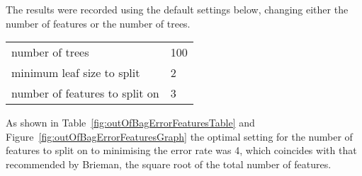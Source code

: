 		\begin{table}[H]
			\centering
			\begin{subtable}{.45\linewidth}\centering
				\hfill
				\caption{error rate for features}
				\label{fig:outOfBagErrorFeaturesTable}    				
    			\end{subtable}
    			\hfill
			\begin{subtable}{.45\linewidth}\centering
    				\caption{error rate for number of trees}
				\label{fig:outOfBagErrorTreesTable}
    			\end{subtable}
    			\caption{Tables of Optimisation Results}
    			\label{fig:optimisationResultsTables}	
    		\end{table}

		The results were recorded using the default settings below, changing either the number of features or the number of trees.

		\begin{table}[h]
			\begin{tabular}{ll}
				{number of trees} 				& 100\\
				{minimum leaf size to split}		& 2\\
				{number of features to split on}	& 3\\
			\end{tabular}
		\end{table}		
		
		As shown in Table~\ref{fig:outOfBagErrorFeaturesTable} and Figure~\ref{fig:outOfBagErrorFeaturesGraph} the optimal setting for the number of features to split on to minimising the error rate was 4, which coincides with that recommended by Brieman, the square root of the total number of features.\\
		
